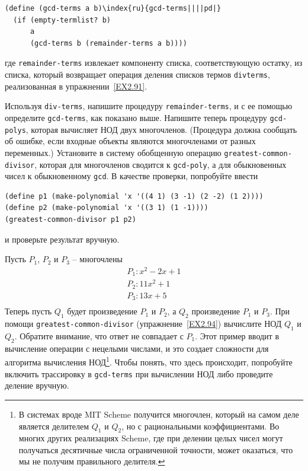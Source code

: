 \begin{Verbatim}[fontsize=\small]
(define (gcd-terms a b)\index{ru}{gcd-terms||||pd|}
  (if (empty-termlist? b)
      a
      (gcd-terms b (remainder-terms a b))))
\end{Verbatim}
где {\tt remainder-terms} извлекает компоненту списка,
соответствующую остатку, из списка, который возвращает операция деления
списков термов {\tt div\-terms}, реализованная в 
упражнении~\ref{EX2.91}.
\begin{exercise}{2.94}\label{EX2.94}%
Используя {\tt div-terms}, напишите процедуру
 {\tt remainder-terms}, и с ее помощью определите
{\tt gcd-terms}, как показано выше.  Напишите теперь процедуру
{\tt gcd-polys}, которая вычисляет  НОД двух многочленов.
(Процедура должна сообщать об ошибке, если входные объекты являются многочленами от разных переменных.)  Установите в систему обобщенную операцию
{\tt greatest-common-divisor}, которая для многочленов сводится
к {\tt gcd-poly}, а для обыкновенных чисел к обыкновенному
{\tt gcd}.  В качестве проверки, попробуйте ввести

\begin{Verbatim}[fontsize=\small]
(define p1 (make-polynomial 'x '((4 1) (3 -1) (2 -2) (1 2))))
(define p2 (make-polynomial 'x '((3 1) (1 -1))))
(greatest-common-divisor p1 p2)
\end{Verbatim}
и проверьте результат вручную.
\end{exercise}
\begin{exercise}{2.95}\label{EX2.95}%
Пусть $P_1$,
$P_2$ и $P_3$ --
многочлены
$$
\begin{array}{l}
P_1: x^2 - 2x + 1\\
P_2: 11x^2 + 1\\
P_3: 13x + 5\\
\end{array}
$$
Теперь пусть 
$Q_1$ будет произведение
$P_1$ и $P_2$,
а $Q_2$ произведение
$P_1$ и $P_3$.
При помощи {\tt greatest-common-divisor} 
(упражнение~\ref{EX2.94}) вычислите НОД
$Q_1$ и $Q_2$.
Обратите внимание, что ответ не совпадает с 
$P_1$.  Этот пример вводит в вычисление операции
с нецелыми числами, и это создает сложности для алгоритма вычисления
НОД\footnote{В системах вроде MIT Scheme получится многочлен,
который на самом деле является делителем $Q_1$ и
$Q_2$, но с рациональными коэффициентами.  Во
многих других реализациях Scheme, где при делении целых чисел могут
получаться десятичные числа ограниченной точности, может оказаться,
что мы не получим правильного делителя.}.
Чтобы понять, что здесь происходит, попробуйте
включить трассировку в {\tt gcd-terms} при вычислении НОД либо
проведите деление вручную.
\end{exercise}

